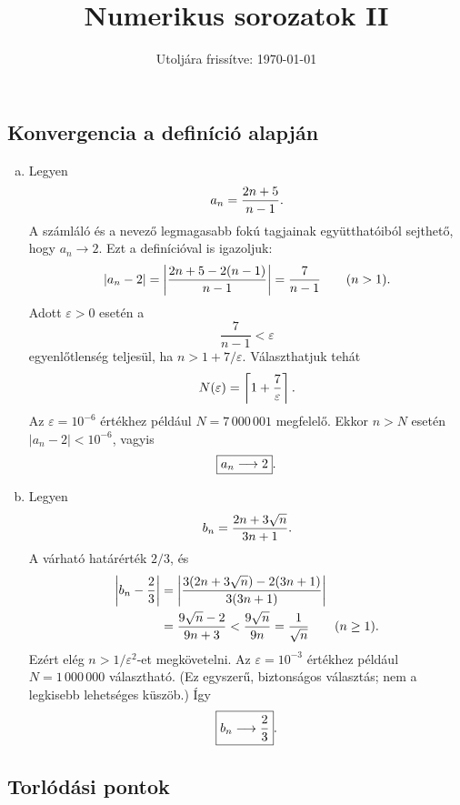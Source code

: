 \documentclass{szb-solution}
\title{Numerikus sorozatok II}
\date{Utoljára frissítve: \today}
\begin{document}
\maketitle

\subsection{Konvergencia a definíció alapján}

\begin{enumerate}[a)]
  \item Legyen
        $$
          a_n=\frac{2n+5}{n-1}
          \text.
        $$
        A számláló és a nevező legmagasabb fokú tagjainak együtthatóiból
        sejthető, hogy $a_n\to2$. Ezt a definícióval is igazoljuk:
        $$
          |a_n-2|
          =\left|\frac{2n+5-2(n-1)}{n-1}\right|
          =\frac{7}{n-1}
          \qquad(n>1)
          \text.
        $$
        Adott $\varepsilon>0$ esetén a
        $$
          \frac{7}{n-1}<\varepsilon
        $$
        egyenlőtlenség teljesül, ha $n>1+7/\varepsilon$. Választhatjuk tehát
        $$
          N(\varepsilon)=\left\lceil 1+\frac7\varepsilon\right\rceil
          \text.
        $$
        Az $\varepsilon=10^{-6}$ értékhez például $N=7\,000\,001$
        megfelelő. Ekkor $n>N$ esetén $|a_n-2|<10^{-6}$, vagyis
        $$
          \boxed{a_n\longrightarrow2}
          \text.
        $$

  \item Legyen
        $$
          b_n=\frac{2n+3\sqrt n}{3n+1}
          \text.
        $$
        A várható határérték $2/3$, és
        \begin{align*}
          \left|b_n-\frac23\right|
          &=\left|\frac{3(2n+3\sqrt n)-2(3n+1)}{3(3n+1)}\right|\\
          &=\frac{9\sqrt n-2}{9n+3}
          <\frac{9\sqrt n}{9n}
          =\frac1{\sqrt n}
          \qquad(n\geq1)
          \text.
        \end{align*}
        Ezért elég $n>1/\varepsilon^2$-et megkövetelni. Az
        $\varepsilon=10^{-3}$ értékhez például $N=1\,000\,000$ választható.
        (Ez egyszerű, biztonságos választás; nem a legkisebb lehetséges
        küszöb.) Így
        $$
          \boxed{b_n\longrightarrow\frac23}
          \text.
        $$
\end{enumerate}

\subsection{Torlódási pontok}
\end{document}
